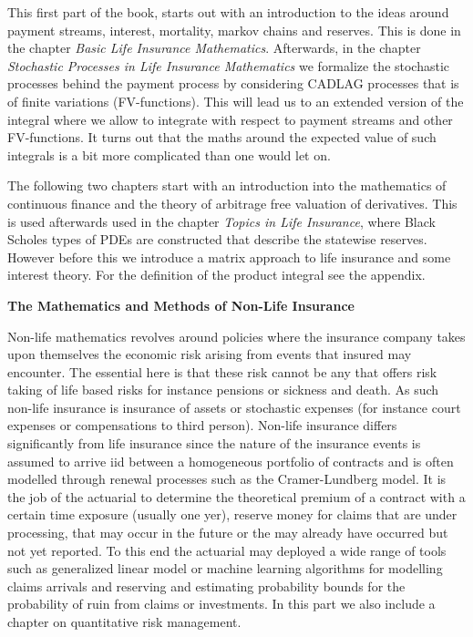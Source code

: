 \documentclass[a4paper,10pt,openany]{book}
\begin{document}
This first part of the book, starts out with an introduction to the ideas around payment streams, interest, mortality, markov chains and reserves. This is done in the chapter \emph{Basic Life Insurance Mathematics}. Afterwards, in the chapter \emph{Stochastic Processes in Life Insurance Mathematics} we formalize the stochastic processes behind the payment process by considering CADLAG processes that is of finite variations (FV-functions). This will lead us to an extended version of the integral where we allow to integrate with respect to payment streams and other FV-functions. It turns out that the maths around the expected value of such integrals is a bit more complicated than one would let on.

The following two chapters start with an introduction into the mathematics of continuous finance and the theory of arbitrage free valuation of derivatives. This is used afterwards used in the chapter \emph{Topics in Life Insurance}, where Black Scholes types of PDEs are constructed that describe the statewise reserves. However before this we introduce a matrix approach to life insurance and some interest theory. For the definition of the product integral see the appendix.

\textbf{The Mathematics and Methods of Non-Life Insurance}

Non-life mathematics revolves around policies where the insurance company takes upon themselves the economic risk arising from events that insured may encounter. The essential here is that these risk cannot be any that offers risk taking of life based risks for instance pensions or sickness and death. As such non-life insurance is insurance of assets or stochastic expenses (for instance court expenses or compensations to third person). Non-life insurance differs significantly from life insurance since the nature of the insurance events is assumed to arrive iid between a homogeneous portfolio of contracts and is often modelled through renewal processes such as the Cramer-Lundberg model. It is the job of the actuarial to determine the theoretical premium of a contract with a certain time exposure (usually one yer), reserve money for claims that are under processing, that may occur in the future or the may already have occurred but not yet reported. To this end the actuarial may deployed a wide range of tools such as generalized linear model or machine learning algorithms for modelling claims arrivals and reserving and estimating probability bounds for the probability of ruin from claims or investments. In this part we also include a chapter on quantitative risk management.
\end{document}
